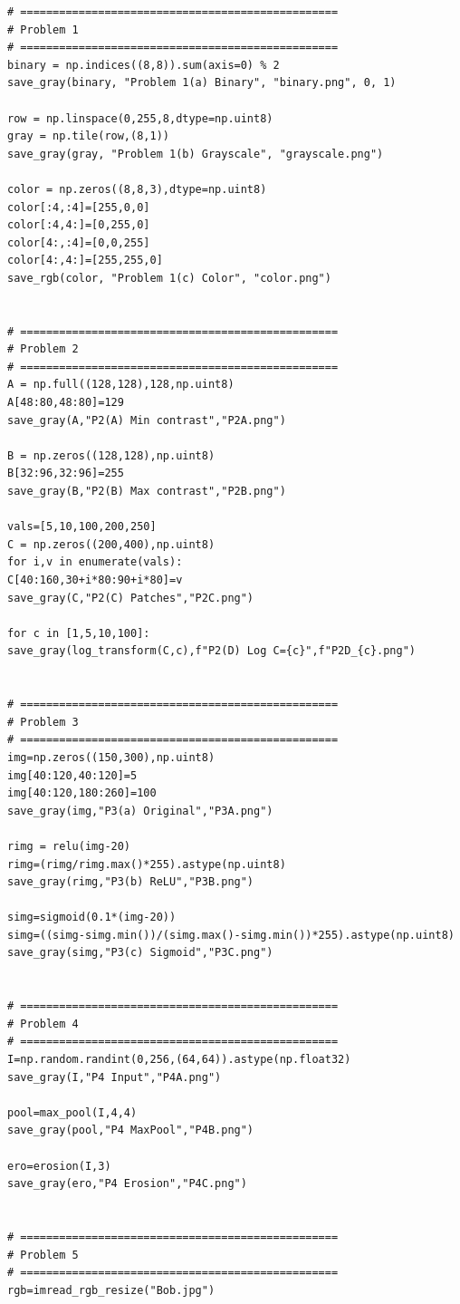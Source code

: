 \documentclass[11pt]{article}
\begin{document}
\begin{lstlisting}
# =================================================
# Problem 1
# =================================================
binary = np.indices((8,8)).sum(axis=0) % 2
save_gray(binary, "Problem 1(a) Binary", "binary.png", 0, 1)

row = np.linspace(0,255,8,dtype=np.uint8)
gray = np.tile(row,(8,1))
save_gray(gray, "Problem 1(b) Grayscale", "grayscale.png")

color = np.zeros((8,8,3),dtype=np.uint8)
color[:4,:4]=[255,0,0]
color[:4,4:]=[0,255,0]
color[4:,:4]=[0,0,255]
color[4:,4:]=[255,255,0]
save_rgb(color, "Problem 1(c) Color", "color.png")


# =================================================
# Problem 2
# =================================================
A = np.full((128,128),128,np.uint8)
A[48:80,48:80]=129
save_gray(A,"P2(A) Min contrast","P2A.png")

B = np.zeros((128,128),np.uint8)
B[32:96,32:96]=255
save_gray(B,"P2(B) Max contrast","P2B.png")

vals=[5,10,100,200,250]
C = np.zeros((200,400),np.uint8)
for i,v in enumerate(vals):
C[40:160,30+i*80:90+i*80]=v
save_gray(C,"P2(C) Patches","P2C.png")

for c in [1,5,10,100]:
save_gray(log_transform(C,c),f"P2(D) Log C={c}",f"P2D_{c}.png")


# =================================================
# Problem 3
# =================================================
img=np.zeros((150,300),np.uint8)
img[40:120,40:120]=5
img[40:120,180:260]=100
save_gray(img,"P3(a) Original","P3A.png")

rimg = relu(img-20)
rimg=(rimg/rimg.max()*255).astype(np.uint8)
save_gray(rimg,"P3(b) ReLU","P3B.png")

simg=sigmoid(0.1*(img-20))
simg=((simg-simg.min())/(simg.max()-simg.min())*255).astype(np.uint8)
save_gray(simg,"P3(c) Sigmoid","P3C.png")


# =================================================
# Problem 4
# =================================================
I=np.random.randint(0,256,(64,64)).astype(np.float32)
save_gray(I,"P4 Input","P4A.png")

pool=max_pool(I,4,4)
save_gray(pool,"P4 MaxPool","P4B.png")

ero=erosion(I,3)
save_gray(ero,"P4 Erosion","P4C.png")


# =================================================
# Problem 5
# =================================================
rgb=imread_rgb_resize("Bob.jpg")


\end{lstlisting}
\end{document}
